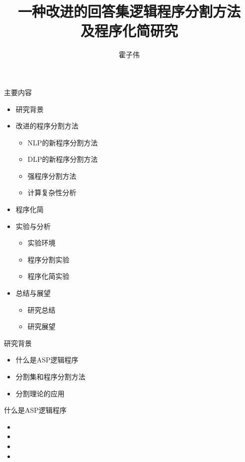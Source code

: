 \documentclass{beamer}
\title{一种改进的回答集逻辑程序分割方法 \\ 及程序化简研究}
\author{霍子伟}
\institute{中山大学软件学院}
\begin{document}
\titlepage


\begin{frame}{主要内容}
	\begin{itemize}
		\item {研究背景}
		\item {改进的程序分割方法
			\begin{itemize}
				\item NLP的新程序分割方法
				\item DLP的新程序分割方法
				\item 强程序分割方法
				\item 计算复杂性分析
			\end{itemize}
			}
		\item {程序化简}
		\item {实验与分析
			\begin{itemize}
				\item 实验环境
				\item 程序分割实验
				\item 程序化简实验
			\end{itemize}
			}
		\item {总结与展望
			\begin{itemize}
				\item 研究总结
				\item 研究展望
			\end{itemize}
			}
	\end{itemize}
\end{frame}


\begin{frame}{研究背景}
	\begin{itemize}
		\item 什么是ASP逻辑程序
		\item 分割集和程序分割方法
		\item 分割理论的应用
	\end{itemize}
\end{frame}


\begin{frame}{什么是ASP逻辑程序}
	\begin{itemize}
		\item 
		\item 
		\item 
		\item 
		
	\end{itemize}
\end{frame}
\end{document}
